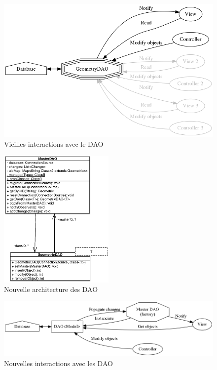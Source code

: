 		\begin{figure}
			\center
			\includegraphics[width=\textwidth]{iteration3/fig/OldDAOInteractions.png}
			\caption{\label{fig:model:olddaointeraction} Vieilles interactions avec le DAO}
		\end{figure}
		\begin{figure}
			\center
			\includegraphics[width=0.5\textwidth]{iteration3/fig/NewDAOArchitecture.eps}
			\caption{\label{fig:model:newdaoarchi} Nouvelle architecture des DAO}
		\end{figure}
		\begin{figure}
			\center
			\includegraphics[width=\textwidth]{iteration3/fig/NewDAOInteractions.png}
			\caption{\label{fig:model:newdaointeractions} Nouvelles interactions avec les DAO}
		\end{figure}

